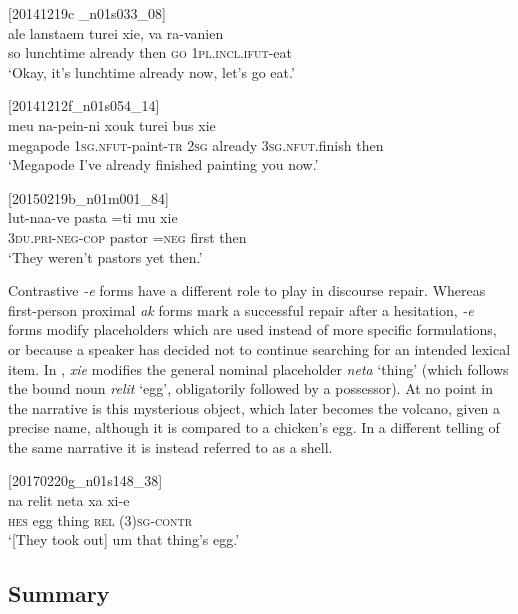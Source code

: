 \documentclass[output=paper,colorlinks,citecolor=brown]{langscibook}
\begin{document}
\ea
{\label{ex:ridge:48}[20141219c \_n01s033\_08]}\\
\gll ale  lanstaem  turei    xie,  va      ra-vanien \\
     so   lunchtime   already   then   \textsc{go} \textsc{1pl.incl.ifut}{}-eat\\
\glt ‘Okay, it’s lunchtime already now, let’s go eat.’
\z

\ea
{\label{ex:ridge:49}[20141212f\_n01s054\_14]}\\
\gll meu     na-pein-ni     xouk   turei       bus       xie \\
     megapode   \textsc{1sg.nfut}-paint-\textsc{tr}   \textsc{2sg}   already \textsc{3sg.nfut.}finish   then  \\
\glt ‘Megapode I’ve already finished painting you now.’
\z

\ea
{\label{ex:ridge:50}[20150219b\_n01m001\_84]}\\
\gll lut-naa-ve    pasta  =ti  mu  xie\\
     \textsc{3du.pri-neg-cop}   pastor \textsc{=neg}   first   then\\
\glt ‘They weren’t pastors yet then.’
\z

Contrastive \textit{-e} forms have a different role to play in discourse repair. Whereas first-person proximal \textit{ak} forms mark a successful repair after a hesitation, \textit{{}-e} forms modify placeholders which are used instead of more specific formulations, or because a speaker has decided not to continue searching for an intended lexical item. In , \textit{xie} modifies the general nominal placeholder \textit{neta} ‘thing’ (which follows the bound noun \textit{relit} ‘egg’, obligatorily followed by a possessor). At no point in the narrative is this mysterious object, which later becomes the volcano, given a precise name, although it is compared to a chicken’s egg. In a different telling of the same narrative it is instead referred to as a shell.

\ea
{\label{ex:ridge:51}[20170220g\_n01s148\_38]}\\
\gll na  relit  neta  xa  xi-e\\
     \textsc{hes}  egg  thing  \textsc{rel}  \textsc{(3)sg-contr}\\
\glt ‘[They took out] um that thing’s egg.’
\z


\subsection{Summary}
\label{sec:ridge:4.4}
\end{document}
